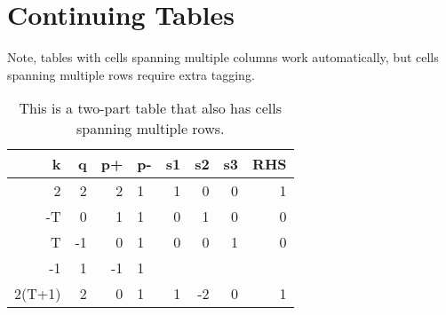\section{Continuing Tables}
Note, tables with cells spanning multiple columns work automatically, but cells spanning multiple rows require extra tagging.
\begin{table}[ht]
    \caption{This is a two-part table that also has cells spanning multiple rows.}
    \begin{tabular}{rrrlrrrr}
        k      & q          & p+ & p- & s1                                                         & s2                                                         & s3                                                         & RHS       \\ \hline
        2      & 2          & 2  & 1  & 1                                                          & 0                                                          & 0                                                          & 1         \\
        -T     & 0          & 1  & 1  & 0                                                          & 1                                                          & 0                                                          & 0         \\
        T      & -1         & 0  & 1  & 0                                                          & 0                                                          & 1                                                          & 0         \\
        -1     & 1          & -1 & 1  &                                                            &                                                            &                                                            &           \\ \hline
        2(T+1) & 2          & 0  & 1  & 1                                                          & -2                                                         & 0                                                          & 1         \\ \hline

\end{tabular}
\end{table}
